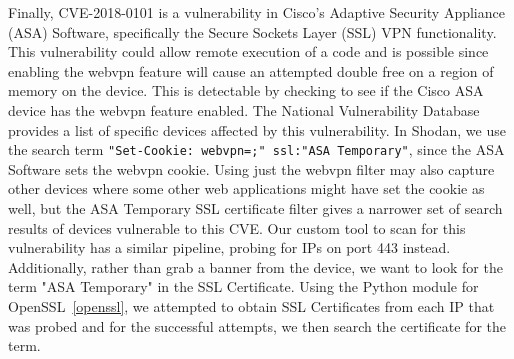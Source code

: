 Finally, CVE-2018-0101 is a vulnerability in Cisco's Adaptive Security Appliance (ASA)
Software, specifically the Secure Sockets Layer (SSL) VPN functionality. This
vulnerability could allow remote execution of a code and is possible since
enabling the webvpn feature will cause an attempted double free on a region
of memory on the device. This is detectable by checking to see if the Cisco
ASA device has the webvpn feature enabled. The National Vulnerability Database
provides a list of specific devices affected by this vulnerability\cite{CVE-2018-0101}. In Shodan,
we use the search term \verb|"Set-Cookie: webvpn=;" ssl:"ASA Temporary"|,
since the ASA Software sets the webvpn cookie. Using just the webvpn filter
may also capture other devices where some other web applications might have
set the cookie as well, but the ASA Temporary SSL certificate filter gives
a narrower set of search results of devices vulnerable to this CVE. 
Our custom tool to scan for this vulnerability has a similar pipeline, probing for
IPs on port 443 instead. Additionally, rather than grab a banner from the device,
we want to look for the term "ASA Temporary" in the SSL Certificate. Using the Python
module for OpenSSL~\ref{openssl}, we attempted to obtain SSL Certificates from each IP
that was probed and for the successful attempts, we then search the certificate
for the term.
